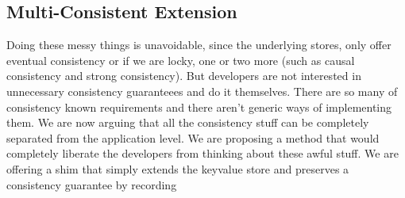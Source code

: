 \subsection{Multi-Consistent Extension}
Doing these messy things is unavoidable, since the underlying stores,
only offer eventual consistency or if we are locky, one or two more
(such as causal consistency and strong consistency). But developers are
not interested in unnecessary consistency guaranteees and do it
themselves. There are so many of consistency known requirements and
there aren't generic ways of implementing them.
We are now arguing that all the consistency stuff can be
completely separated from the application level. We are proposing a
method that would completely liberate the developers from thinking about
these awful stuff. We are offering a shim that simply extends the
keyvalue store and preserves a consistency guarantee by recording

